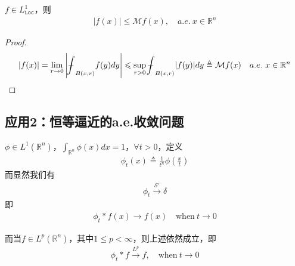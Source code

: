 \begin{Corollary}
    $f\in L^1_{\texttt{Loc}}$，则
    \begin{align*}
        |f(x)| \leqslant \mathcal{M} f(x),\quad a.e.\ x\in\mathbb{R}^n
    \end{align*}
\end{Corollary}
\begin{proof}
    \begin{align*}
        |f(x)| = \lim\limits_{r\to 0} \left| \bbint_{B(x,r)} f(y) dy\right| \leqslant \sup\limits_{r>0} \bbint_{B(x,r)} |f(y)| dy \triangleq \mathcal{M} f(x) \quad a.e.\ x\in\mathbb{R}^n
    \end{align*}
\end{proof}

\subsection*{应用2：恒等逼近的a.e.收敛问题}
\begin{remark}
    $\phi\in L^1(\mathbb{R}^n)$，$\int_{\mathbb{R}^n} \phi(x) dx = 1$，$\forall t > 0$，定义
    \begin{align*}
        \phi_t(x) \triangleq \frac{1}{t^n} \phi\left(\frac{x}{t}\right)
    \end{align*}
    而显然我们有
    \begin{align*}
        \phi_t \xrightarrow{\mathcal{S}'} \delta
    \end{align*}
    即
    \begin{align*}
        \phi_t * f(x) \to f(x) \quad \text{when}\ t\to 0
    \end{align*}

    而当$f\in L^p(\mathbb{R}^n)$，其中$1\leqslant p <\infty$，则上述依然成立，即
    \begin{align*}
        \phi_t * f \xrightarrow{L^p} f,\quad \text{when}\ t\to 0
    \end{align*}
\end{remark}

